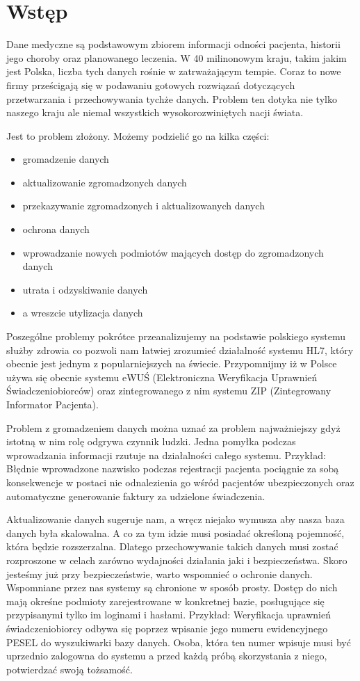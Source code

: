 \section{Wstęp}
\label{cha:wstep}

Dane medyczne są podstawowym zbiorem informacji odności pacjenta, historii jego choroby oraz planowanego leczenia. W 40 milinonowym kraju, takim jakim jest Polska, liczba tych danych rośnie w zatrważającym tempie. Coraz to nowe firmy prześcigają się w podawaniu gotowych rozwiązań dotyczących przetwarzania i przechowywania tychże danych. Problem ten dotyka nie tylko naszego kraju ale niemal wszystkich wysokorozwiniętych nacji świata.

Jest to problem złożony. Możemy podzielić go na kilka części:
\begin{itemize}
	\item gromadzenie danych
	\item aktualizowanie zgromadzonych danych
	\item przekazywanie zgromadzonych i aktualizowanych danych
	\item ochrona danych
	\item wprowadzanie nowych podmiotów mających dostęp do zgromadzonych danych
	\item utrata i odzyskiwanie danych
	\item a wreszcie utylizacja danych
\end{itemize}

Poszególne problemy pokrótce przeanalizujemy na podstawie polskiego systemu służby zdrowia co pozwoli nam łatwiej zrozumieć działalność systemu HL7, który obecnie jest jednym z popularniejszych na świecie. \cite{20} Przypomnijmy iż w Polsce używa się obecnie systemu eWUŚ (Elektroniczna Weryfikacja Uprawnień Świadczeniobiorców) oraz zintegrowanego z nim systemu ZIP (Zintegrowany Informator Pacjenta).

Problem z gromadzeniem danych można uznać za problem najważniejszy gdyż istotną w nim rolę odgrywa czynnik ludzki. Jedna pomyłka podczas wprowadzania informacji rzutuje na działalności całego systemu. \cite{25} Przykład: Błędnie wprowadzone nazwisko podczas rejestracji pacjenta pociągnie za sobą konsekwencje w postaci nie odnalezienia go wśród pacjentów ubezpieczonych oraz automatyczne generowanie faktury za udzielone świadczenia.

Aktualizowanie danych sugeruje nam, a wręcz niejako wymusza aby nasza baza danych była skalowalna. \cite{21} A co za tym idzie musi posiadać określoną pojemność, która będzie rozszerzalna. Dlatego przechowywanie takich danych musi zostać rozproszone w celach zarówno wydajności działania jaki i bezpieczeństwa.
Skoro jesteśmy już przy bezpieczeństwie, warto wspomnieć o ochronie danych. Wspomniane przez nas systemy są chronione w sposób prosty. Dostęp do nich mają okreśne podmioty zarejestrowane w konkretnej bazie, posługujące się przypisanymi tylko im loginami i hasłami. \cite{25} Przykład: Weryfikacja uprawnień świadczeniobiorcy odbywa się poprzez wpisanie jego numeru ewidencyjnego PESEL do wyszukiwarki bazy danych. Osoba, która ten numer wpisuje musi być uprzednio zalogowna do systemu a przed każdą próbą skorzystania z niego, potwierdzać swoją tożsamość.

